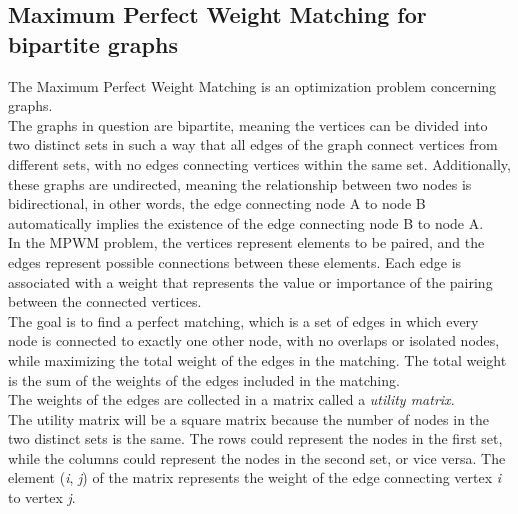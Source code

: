 \subsection{Maximum Perfect Weight Matching for bipartite graphs}
The Maximum Perfect Weight Matching is an optimization problem concerning graphs. \\
The graphs in question are bipartite, meaning the vertices can be divided into two distinct sets in such a way that all edges of the graph connect vertices from different sets, with no edges connecting vertices within the same set.
Additionally, these graphs are undirected, meaning the relationship between two nodes is bidirectional, in other words, the edge connecting node A to node B automatically implies the existence of the edge connecting node B to node A. \\
In the MPWM problem, the vertices represent elements to be paired, and the edges represent possible connections between these elements. Each edge is associated with a weight that represents the value or importance of the pairing between the connected vertices. \\
The goal is to find a perfect matching, which is a set of edges in which every node is connected to exactly one other node, with no overlaps or isolated nodes, while maximizing the total weight of the edges in the matching.
The total weight is the sum of the weights of the edges included in the matching. \\
The weights of the edges are collected in a matrix called a \textit{utility matrix}.\\
The utility matrix will be a square matrix because the number of nodes in the two distinct sets is the same.
The rows could represent the nodes in the first set, while the columns could represent the nodes in the second set, or vice versa.
The element (\textit{i}, \textit{j}) of the matrix represents the weight of the edge connecting vertex \textit{i} to vertex \textit{j}. 


